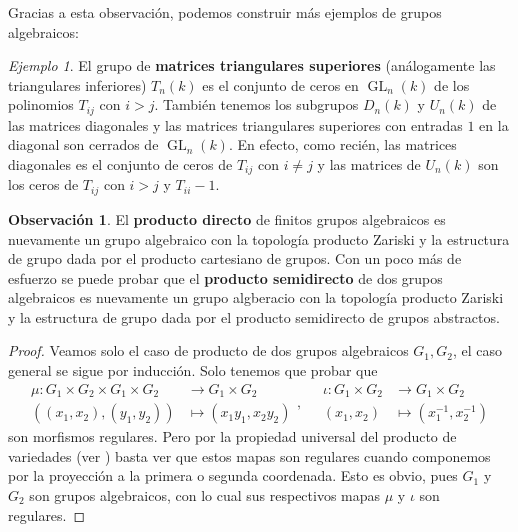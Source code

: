 \documentclass[spanish,10pt]{amsart}
\theoremstyle{definition}
\newtheorem{obs}[theorem]{Observación}
\theoremstyle{remark}
\newtheorem{example}[theorem]{Ejemplo}
\numberwithin{equation}{section}
\begin{document}
Gracias a esta observación, podemos construir más ejemplos de grupos algebraicos:
\begin{example}
El grupo de \textbf{matrices triangulares superiores} (análogamente las triangulares inferiores) $T_n (k)$ es el conjunto de ceros en $\operatorname{GL}_n (k)$ de los polinomios $T_{ij}$ con $i >j$. También tenemos los subgrupos $D_n (k)$ y $U_n (k)$ de las matrices diagonales y las matrices triangulares superiores con entradas $1$ en la diagonal son cerrados de $\operatorname{GL}_n (k)$. En efecto, como recién, las matrices diagonales es el conjunto de ceros de $T_{ij}$ con $i \neq j$ y las matrices de $U_n (k)$ son los ceros de $T_{ij}$ con $i > j$ y $T_{ii} - 1$.
\end{example}

\begin{obs}
El \textbf{producto directo} de finitos grupos algebraicos es nuevamente un grupo algebraico con la topología producto Zariski y la estructura de grupo dada por el producto cartesiano de grupos. Con un poco más de esfuerzo se puede probar que el \textbf{producto semidirecto} de dos grupos algebraicos es nuevamente un grupo algberacio con la topología producto Zariski y la estructura de grupo dada por el producto semidirecto de grupos abstractos.
\end{obs}
\begin{proof}
Veamos solo el caso de producto de dos grupos algebraicos $G_1, G_2$, el caso general se sigue por inducción. Solo tenemos que probar que
\[
    \begin{array}{ll}
    \mu : G_1 \times G_2 \times G_1 \times G_2 &\longrightarrow G_1 \times G_2 \\
    ((x_1,x_2),(y_1,y_2)) &\longmapsto (x_1 y_1, x_2 y_2)
    \end{array}, \quad
    \begin{array}{ll}
    \iota : G_1 \times G_2 &\longrightarrow G_1 \times G_2 \\
    (x_1, x_2) &\longmapsto (x_1^{-1}, x_2^{-1})
    \end{array}
\]
son morfismos regulares. Pero por la propiedad universal del producto de variedades (ver \cite[Teorema 2.6.5.]{notas_pedro}) basta ver que estos mapas son regulares cuando componemos por la proyección a la primera o segunda coordenada. Esto es obvio, pues $G_1$ y $G_2$ son grupos algebraicos, con lo cual sus respectivos mapas $\mu$ y $\iota$ son regulares.
\end{proof}
\end{document}
